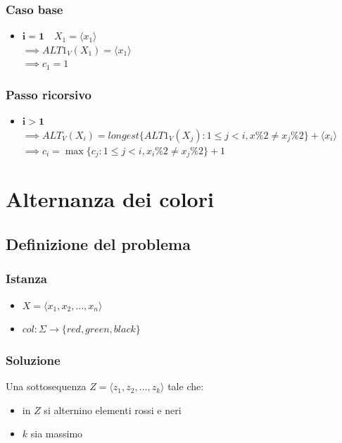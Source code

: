 \subsubsection{Caso base}
\begin{itemize}
    \item $\mathbf{i=1} \quad X_1= \langle x_1 \rangle$ \\
    $\implies ALT1_V(X_1) = \langle x_1 \rangle$ \\
    $\implies c_1 = 1$
\end{itemize}

\subsubsection{Passo ricorsivo}
\begin{itemize}
    \item $\mathbf{i > 1}$ \\
    $\implies ALT_V(X_i) = longest\{ALT1_V(X_j) : 1 \leq j < i, x\%2 \not = x_j \%2\} + \langle x_i \rangle$ \\
    $\implies c_i = \max\{c_j : 1 \leq j < i, x_i\%2 \not = x_j \% 2 \} + 1$
\end{itemize}

\newpage
\section{Alternanza dei colori}

\subsection{Definizione del problema}
\subsubsection{Istanza}
\begin{itemize}
    \item $X = \langle x_1, x_2, \dots, x_n \rangle$
    \item $col:\Sigma \to \{red, green, black\}$
\end{itemize}

\subsubsection{Soluzione}
Una sottosequenza $Z = \langle z_1, z_2, \dots, z_k \rangle$ tale che:
\begin{itemize}
    \item in $Z$ si alternino elementi rossi e neri
    \item $k$ sia massimo
\end{itemize}

